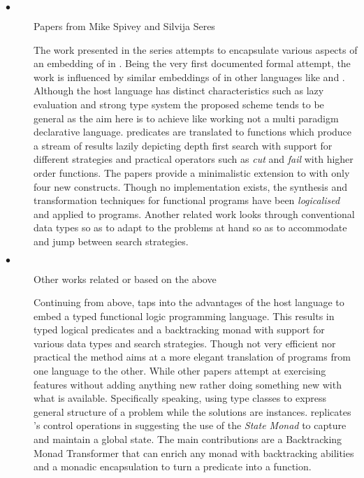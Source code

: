 \documentclass[thesis-solanki.tex]{subfiles}
\begin{document}
\begin{description}

\item[$\bullet$] Papers from Mike Spivey and Silvija Seres


  The work presented in the series
  \cite{spivey1999embedding,seres1999algebra,seres2001higher,spivey1999algebra,seres2001algebra} attempts to
  encapsulate various aspects of an embedding of  in .
  Being the very first documented formal attempt, the work is influenced by similar embeddings of 
  in other languages like  and .
  Although the host language has distinct characteristics such as lazy evaluation and strong type system the
  proposed scheme tends to be general as the aim here is to achieve  like working not a multi
  paradigm declarative language.
   predicates are translated to  functions which produce a stream of results
  lazily depicting depth first search with support for different strategies and practical operators such as
  \textit{cut} and \textit{fail} with higher order functions.
  The papers provide a minimalistic extension to  with only four new constructs.
  Though no implementation exists, the synthesis and transformation techniques for functional programs have been
  \textit{logicalised} and applied to  programs.
  Another related work \cite{spivey2000functional} looks through conventional data types so as to adapt to the
  problems at hand so as to accommodate and jump between search strategies.


\item[$\bullet$] Other works related or based on the above


  Continuing from above, \cite{claessen2000typed} taps into the advantages of the host language to embed a typed
  functional logic programming language.
  This results in typed logical predicates and a backtracking monad with support for various data types and search
  strategies.
  Though not very efficient nor practical the method aims at a more elegant translation of programs from one
  language to the other.
  While other papers \cite{erwig2004escape} attempt at exercising  features without adding
  anything new rather doing something new with what is available.
  Specifically speaking, using  type classes to express general structure of a problem while the
  solutions are instances.
  \cite{hinze1998prological} replicates 's control operations in  suggesting the
  use of the  \textit{State Monad} to capture and maintain a global state.
  The main contributions are a Backtracking Monad Transformer that can enrich any monad with backtracking abilities
  and a monadic encapsulation to turn a  predicate into a  function.



\end{description}
\end{document}
